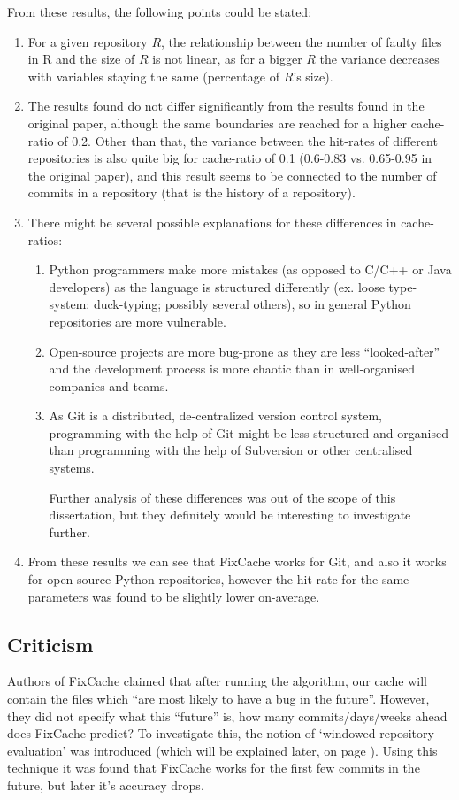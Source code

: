 \documentclass[12pt,twoside,notitlepage]{report}
\newcommand{\fxch}{FixCache}
\begin{document}
From these results, the following points could be stated:
\begin{enumerate}
\item For a given repository $R$, the relationship between the number of faulty files in R and the size of $R$ is not linear, as for a bigger $R$ the variance decreases with variables staying the same (percentage of $R$'s size).
\item The results found do not differ significantly from the results found in the original paper, although the same boundaries are reached for a higher cache-ratio of 0.2. Other than that, the variance between the hit-rates of different repositories is also quite big for cache-ratio of 0.1 (0.6-0.83 vs. 0.65-0.95 in the original paper), and this result seems to be connected to the number of commits in a repository (that is the history of a repository).
\clearpage
\item There might be several possible explanations for these differences in cache-ratios:
\begin{enumerate}
\item Python programmers make more mistakes (as opposed to C/C++ or Java developers) as the language is structured differently (ex. loose type-system: duck-typing; possibly several others), so in general Python repositories are more vulnerable.
\item Open-source projects are more bug-prone as they are less ``looked-after'' and the development process is more chaotic than in well-organised companies and teams.
\item As Git is a distributed, de-centralized version control system, programming with the help of Git might be less structured and organised than programming with the help of Subversion or other centralised systems.

Further analysis of these differences was out of the scope of this dissertation, but they definitely would be interesting to investigate further.
\end{enumerate}
\item From these results we can see that \fxch{} works for Git, and also it works for open-source Python repositories, however the hit-rate for the same parameters was found to be slightly lower on-average.
\end{enumerate}
\subsection{Criticism}
Authors of \fxch{} claimed that after running the algorithm, our cache will contain the files which ``are most likely to have a bug in the future''. However, they did not specify what this ``future'' is, how many commits/days/weeks ahead does \fxch{} predict? To investigate this, the notion of `windowed-repository evaluation'  was introduced (which will be explained later, on page \pageref{windowedrep} ). Using this technique it was found that \fxch{} works for the first few commits in the future, but later it's accuracy drops.
\end{document}
